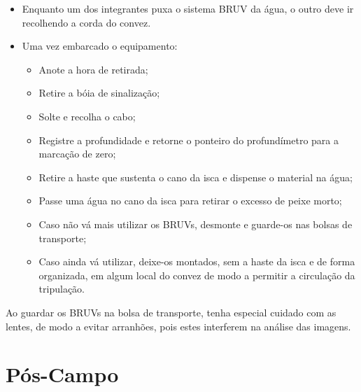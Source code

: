 \documentclass[
  12pt,
  letterpaper,
  DIV=11,
  numbers=noendperiod]{scrreprt}
\begin{document}
\begin{itemize}
\item
  Enquanto um dos integrantes puxa o sistema BRUV da água, o outro deve
  ir recolhendo a corda do convez.
\item
  Uma vez embarcado o equipamento:

  \begin{itemize}
  \item
    Anote a hora de retirada;
  \item
    Retire a bóia de sinalização;
  \item
    Solte e recolha o cabo;
  \item
    Registre a profundidade e retorne o ponteiro do profundímetro para a
    marcação de zero;
  \item
    Retire a haste que sustenta o cano da isca e dispense o material na
    água;
  \item
    Passe uma água no cano da isca para retirar o excesso de peixe
    morto;
  \item
    Caso não vá mais utilizar os BRUVs, desmonte e guarde-os nas bolsas
    de transporte;
  \item
    Caso ainda vá utilizar, deixe-os montados, sem a haste da isca e de
    forma organizada, em algum local do convez de modo a permitir a
    circulação da tripulação.
  \end{itemize}
\end{itemize}

\begin{tcolorbox}[enhanced jigsaw, breakable, rightrule=.15mm, colback=white, bottomrule=.15mm, opacitybacktitle=0.6, left=2mm, coltitle=black, leftrule=.75mm, toptitle=1mm, toprule=.15mm, bottomtitle=1mm, titlerule=0mm, title=\textcolor{quarto-callout-caution-color}{\faFire}\hspace{0.5em}{Caution}, colframe=quarto-callout-caution-color-frame, arc=.35mm, colbacktitle=quarto-callout-caution-color!10!white, opacityback=0]

Ao guardar os BRUVs na bolsa de transporte, tenha especial cuidado com
as lentes, de modo a evitar arranhões, pois estes interferem na análise
das imagens.

\end{tcolorbox}

\chapter{Pós-Campo}\label{puxf3s-campo}
\end{document}
